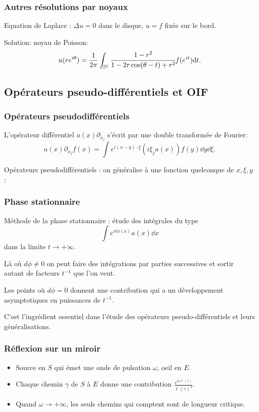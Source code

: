 \documentclass[mathserif]{beamer}
\begin{document}
\begin{frame}
  \frametitle{Autres résolutions par noyaux}
  Equation de Laplace : $\Delta u=0$ dans le disque, $u=f$ fixée sur le bord.

  Solution: noyau de Poisson:
  \[u(re^{i\theta})=\frac{1}{2\pi}\int_{\mathbb{S}^1}\cfrac{1-r^2}{1-2r\cos(\theta-t)+r^2}f(e^{it})\mathrm{d} t.\]
\end{frame}


\subsection{Opérateurs pseudo-différentiels et OIF}

\begin{frame}
  \frametitle{Opérateurs pseudodifférentiels}
  L'opérateur différentiel $a(x)\partial_{x_j}$ s'écrit par une double
  transformée de Fourier:
  \[
    a(x)\partial_{x_j}f(x)=\int e^{i(x-y)\cdot \xi}(i\xi_ja(x))f(y)\dd
    y \dd \xi.
  \]

  Opérateurs pseudodifférentiels : on généralise à une fonction
  quelconque de $x,\xi,y$ :




\end{frame}

\begin{frame}
  \frametitle{Phase stationnaire}
  Méthode de la phase stationnaire : étude des intégrales du type
  \[
    \int e^{it\phi(x)}a(x)\dd x
  \]
  dans la limite $t\to +\infty$.

  Là où $d\phi \neq 0$ on peut faire des intégrations par parties successives et
  sortir autant de facteurs $t^{-1}$ que l'on veut.

  Les points où $d\phi=0$ donnent une contribution qui a un
  développement asymptotiques en puissances de $t^{-1}$.

  C'est l'ingrédient essentiel dans l'étude des opérateurs
  pseudo-différentiels et leurs généralisations.
\end{frame}

\begin{frame}
  \frametitle{Réflexion sur un miroir}
  \begin{itemize}
  \item 
  Source en $S$ qui émet une onde de pulsation $\omega$, oeil en
  $E$.
\item 
  Chaque chemin $\gamma $ de $S$ à $E$ donne une contribution
  $\frac{e^{i\omega\ell(\gamma)}}{\ell(\gamma)^2}.$
\item 
  Quand $\omega\to +\infty$, les seuls chemins qui comptent sont de
  longueur critique.
  \end{itemize}
\end{frame}
\end{document}
